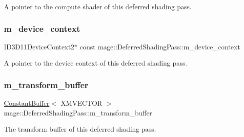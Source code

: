 A pointer to the compute shader of this deferred shading pass. \hypertarget{classmage_1_1_deferred_shading_pass_aebba2ee59d127f2c186186c667c6016a}{}\label{classmage_1_1_deferred_shading_pass_aebba2ee59d127f2c186186c667c6016a} 
\subsubsection{\texorpdfstring{m\+\_\+device\+\_\+context}{m\_device\_context}}
{\footnotesize\ttfamily I\+D3\+D11\+Device\+Context2$\ast$ const mage\+::\+Deferred\+Shading\+Pass\+::m\+\_\+device\+\_\+context\hspace{0.3cm}{\ttfamily [private]}}

A pointer to the device context of this deferred shading pass. \hypertarget{classmage_1_1_deferred_shading_pass_af713e9f0bc35a4be22395483742ee3c3}{}\label{classmage_1_1_deferred_shading_pass_af713e9f0bc35a4be22395483742ee3c3} 
\subsubsection{\texorpdfstring{m\+\_\+transform\+\_\+buffer}{m\_transform\_buffer}}
{\footnotesize\ttfamily \hyperlink{structmage_1_1_constant_buffer}{Constant\+Buffer}$<$ X\+M\+V\+E\+C\+T\+OR $>$ mage\+::\+Deferred\+Shading\+Pass\+::m\+\_\+transform\+\_\+buffer\hspace{0.3cm}{\ttfamily [private]}}

The transform buffer of this deferred shading pass. 